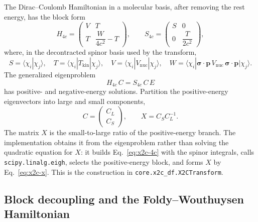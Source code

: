 The Dirac--Coulomb Hamiltonian in a molecular basis, after removing the
rest energy, has the block form
\begin{equation}
  H_{4c} =
  \begin{pmatrix}
    V & T\\
    T & \dfrac{W}{4c^{2}}-T
  \end{pmatrix},
  \qquad
  S_{4c} =
  \begin{pmatrix}
    S & 0\\
    0 & \dfrac{T}{2c^{2}}
  \end{pmatrix},
  \label{eq:x2c-4c}
\end{equation}
where, in the decontracted spinor basis used by the transform,
\begin{equation}
  S = \langle \chi_i|\chi_j\rangle,
  \quad
  T = \langle \chi_i|T_{\mathrm{kin}}|\chi_j\rangle,
  \quad
  V = \langle \chi_i|V_{\mathrm{nuc}}|\chi_j\rangle,
  \quad
  W = \langle \chi_i|\boldsymbol{\sigma}\cdot\mathbf{p}\,
      V_{\mathrm{nuc}}\,
      \boldsymbol{\sigma}\cdot\mathbf{p}|\chi_j\rangle.
  \label{eq:x2c-integrals}
\end{equation}
The generalized eigenproblem
\begin{equation}
  H_{4c}\,C = S_{4c}\,C\,E
  \label{eq:x2c-eigen}
\end{equation}
has positive- and negative-energy solutions.  Partition the
positive-energy eigenvectors into large and small components,
\begin{equation}
  C = \begin{pmatrix} C_L\\ C_S\end{pmatrix},
  \qquad
  X = C_S C_L^{-1}.
  \label{eq:x2c-x}
\end{equation}
The matrix $X$ is the small-to-large ratio of the positive-energy
branch.  The implementation obtains it from the eigenproblem rather
than solving the quadratic equation for $X$: it builds
Eq.~\eqref{eq:x2c-4c} with the spinor integrals, calls
\texttt{scipy.linalg.eigh}, selects the positive-energy block, and
forms $X$ by Eq.~\eqref{eq:x2c-x}.  This is the construction in
\texttt{core.x2c\_df.X2CTransform}.

\subsection{Block decoupling and the Foldy--Wouthuysen Hamiltonian}

